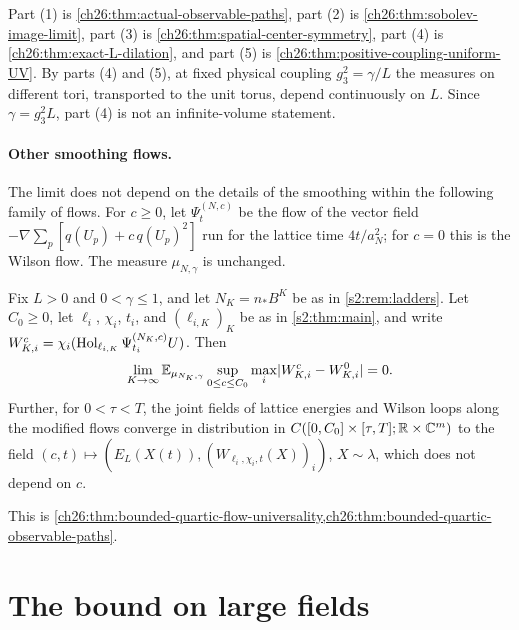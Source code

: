 Part (1) is \cref{ch26:thm:actual-observable-paths}, part (2) is \cref{ch26:thm:sobolev-image-limit}, part (3) is \cref{ch26:thm:spatial-center-symmetry}, part (4) is \cref{ch26:thm:exact-L-dilation}, and part (5) is \cref{ch26:thm:positive-coupling-uniform-UV}. By parts (4) and (5), at fixed physical coupling $g_3^2=\gamma/L$ the measures on different tori, transported to the unit torus, depend continuously on $L$. Since $\gamma=g_3^2L$, part (4) is not an infinite-volume statement.

\paragraph{Other smoothing flows.}
The limit does not depend on the details of the smoothing within the following family of flows. For $c\ge0$, let $\Psi^{(N,c)}_t$ be the flow of the vector field $-\nabla\sum_p[q(U_p)+c\,q(U_p)^2]$ run for the lattice time $4t/a_N^2$; for $c=0$ this is the Wilson flow. The measure $\mu_{N,\gamma}$ is unchanged.

\begin{theorem}\label{s2:thm:altflow}
Fix $L>0$ and $0<\gamma\le1$, and let $N_K=n_*B^K$ be as in \cref{s2:rem:ladders}. Let $C_0\ge0$, let $\ell_i$, $\chi_i$, $t_i$, and $(\ell_{i,K})_K$ be as in \cref{s2:thm:main}, and write $W^c_{K,i}=\chi_i(\operatorname{Hol}_{\ell_{i,K}}\Psi^{(N_K,c)}_{t_i}U)$. Then
\[
 \lim_{K\to\infty}\mathbb E_{\mu_{N_K,\gamma}}\sup_{0\le c\le C_0}\max_i\lvert W^c_{K,i}-W^0_{K,i}\rvert=0.
\]
Further, for $0<\tau<T$, the joint fields of lattice energies and Wilson loops along the modified flows converge in distribution in $C([0,C_0]\times[\tau,T];\mathbb R\times\mathbb C^m)$ to the field $(c,t)\mapsto(E_L(X(t)),(W_{\ell_i,\chi_i,t}(X))_i)$, $X\sim\lambda$, which does not depend on $c$.
\end{theorem}

This is \cref{ch26:thm:bounded-quartic-flow-universality,ch26:thm:bounded-quartic-observable-paths}.

\section{The bound on large fields}\label{s2:largefield}

